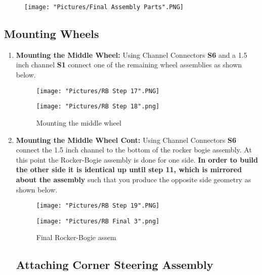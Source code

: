 \documentclass[12pt]{article}
\begin{document}
\begin{figure}[H]
	\centering
	\texttt{[image: "Pictures/Final Assembly Parts".PNG]}
\end{figure}


\subsection{Mounting Wheels}

\begin{enumerate}

\item \textbf{Mounting the Middle Wheel: } Using Channel Connectors \textbf{S6} and a 1.5 inch channel \textbf{S1} connect one of the remaining wheel assemblies as shown below. 

\begin{figure}[H]
  \centering
  \begin{minipage}[b]{0.45\textwidth}
    \texttt{[image: "Pictures/RB Step 17".PNG]}
  \end{minipage}
  \hfill
  \begin{minipage}[b]{0.45\textwidth}
    \texttt{[image: "Pictures/RB Step 18".png]}
  \end{minipage}
  \caption{Mounting the middle wheel}
\end{figure}

\item \textbf{Mounting the Middle Wheel Cont: } Using Channel Connectors \textbf{S6} connect the 1.5 inch channel to the bottom of the rocker bogie assembly. At this point the Rocker-Bogie assembly is done for one side. \textbf{In order to build the other side it is identical up until step 11, which is mirrored about the assembly} such that you produce the opposite side geometry as shown below. 

\begin{figure}[H]
  \centering
  \begin{minipage}[b]{0.45\textwidth}
    \texttt{[image: "Pictures/RB Step 19".PNG]}
  \end{minipage}
  \hfill
  \begin{minipage}[b]{0.45\textwidth}
    \texttt{[image: "Pictures/RB Final 3".png]}
  \end{minipage}
  \caption{Final Rocker-Bogie assem}
\end{figure}


\subsection{Attaching Corner Steering Assembly}


\end{enumerate}
\end{document}
